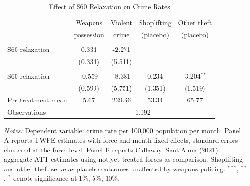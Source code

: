 \begin{table}[t]
\centering
\caption{Effect of S60 Relaxation on Crime Rates}
\label{tab:main_results}
\begin{tabular}{lcccc}
\hline\hline
 & Weapons & Violent & Shoplifting & Other theft \\
 & possession & crime & (placebo) & (placebo) \\
\hline
\addlinespace
\multicolumn{5}{l}{\textit{Panel A: TWFE}} \\
\addlinespace
S60 relaxation & 0.334 & -2.271 & & \\
 & (0.334) & (5.511) & & \\
\addlinespace
\multicolumn{5}{l}{\textit{Panel B: Callaway--Sant'Anna}} \\
\addlinespace
S60 relaxation & -0.559 & -8.381 & 0.234 & -3.204$^{**}$ \\
 & (0.599) & (5.751) & (1.351) & (1.519) \\
\addlinespace
Pre-treatment mean & 5.67 & 239.66 & 53.34 & 65.77 \\
Observations & \multicolumn{4}{c}{1,092} \\
\hline\hline
\end{tabular}
\begin{tablenotes}
\item \textit{Notes:} Dependent variable: crime rate per 100,000 population per month. Panel A reports TWFE estimates with force and month fixed effects, standard errors clustered at the force level. Panel B reports Callaway--Sant'Anna (2021) aggregate ATT estimates using not-yet-treated forces as comparison. Shoplifting and other theft serve as placebo outcomes unaffected by weapons policing. $^{***}$, $^{**}$, $^{*}$ denote significance at 1\%, 5\%, 10\%.
\end{tablenotes}
\end{table}
